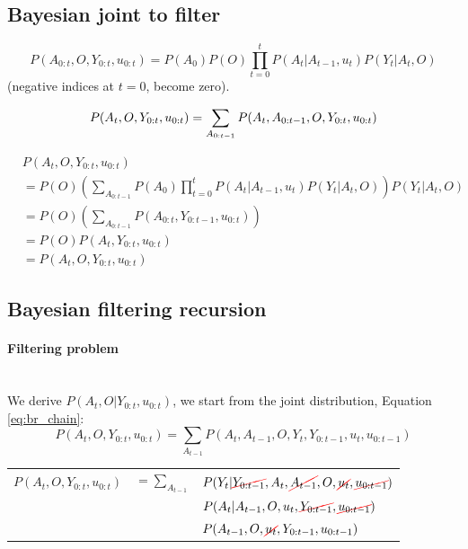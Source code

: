 \subsection{Bayesian joint to filter}\label{appendix:bayes_joint}

\begin{equation}
 P(A_{0:t},O,Y_{0:t},u_{0:t}) = P(A_0)P(O)\prod_{t=0}^t P(A_t|A_{t-1},u_{t}) P(Y_t|A_t,O)
\end{equation}
(negative indices at $t=0$, become zero).

\begin{equation}
  P(A_t,O,Y_{0:t},u_{0:t}) = \sum_{A_{0:t-1}}  P(A_t,A_{0:t-1},O,Y_{0:t},u_{0:t}) \\
\end{equation}

\begin{align}
&P(A_t,O,Y_{0:t},u_{0:t})\\
&= P(O) \left( \sum_{A_{0:t-1}}  P(A_0) \prod_{t=0}^{t} P(A_t|A_{t-1},u_{t}) P(Y_t|A_t,O) \right)  P(Y_t|A_t,O) \\
&= P(O) \left( \sum_{A_{0:t-1}} P(A_{0:t},Y_{0:t-1},u_{0:t}) \right)  \\
&= P(O) P(A_t,Y_{0:t},u_{0:t}) \\
&= P(A_t,O,Y_{0:t},u_{0:t})
\end{align}

\subsection{Bayesian filtering recursion}\label{appendix:bayes_recursion}
\paragraph{Filtering problem}\\
We derive $P(A_t,O|Y_{0:t},u_{0:t})$, we start from the joint distribution, Equation \ref{eq:br_chain}:
\begin{equation}
   P(A_t,O,Y_{0:t},u_{0:t})  = \sum_{A_{t-1}} P(A_t,A_{t-1},O,Y_t,Y_{0:t-1},u_{t},u_{0:t-1}) \label{eq:br_chain} 
\end{equation}


\begin{tabular}{lll}
   $P(A_t,O,Y_{0:t},u_{0:t})$ & $=\sum_{A_{t-1}}$ &  $P(Y_t|\Ccancel[red]{Y_{0:t-1}},A_t,\cancel{A_{t-1}},O,\cancel{u_{t}},\cancel{u_{0:t-1}}) $ \\
			      &  & $P(A_t|A_{t-1},O,u_{t},\Ccancel[red]{Y_{0:t-1}},\Ccancel[red]{u_{0:t-1}}) $ \\
			      &  & $P( A_{t-1},O,\Ccancel[red]{u_t},Y_{0:t-1},u_{0:t-1})$
\end{tabular}

